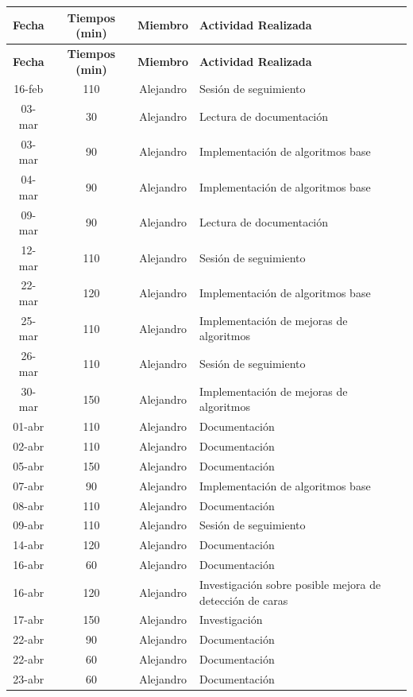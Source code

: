\documentclass[a4paper]{article}
\begin{document}
\begin{center}
\begin{longtable}{|c|c|c|p{8cm}|}
\hline
\textbf{Fecha} & \textbf{Tiempos (min)} & \textbf{Miembro} & \textbf{Actividad Realizada} \\
\hline
\endfirsthead
\hline
\textbf{Fecha} & \textbf{Tiempos (min)} & \textbf{Miembro} & \textbf{Actividad Realizada} \\
\hline
\endhead
16-feb & 110 & Alejandro & Sesión de seguimiento \\
03-mar & 30  & Alejandro & Lectura de documentación \\
03-mar & 90  & Alejandro & Implementación de algoritmos base \\
04-mar & 90  & Alejandro & Implementación de algoritmos base \\
09-mar & 90  & Alejandro & Lectura de documentación \\
12-mar & 110 & Alejandro & Sesión de seguimiento \\
22-mar & 120 & Alejandro & Implementación de algoritmos base \\
25-mar & 110 & Alejandro & Implementación de mejoras de algoritmos \\
26-mar & 110 & Alejandro & Sesión de seguimiento \\
30-mar & 150 & Alejandro & Implementación de mejoras de algoritmos \\
01-abr & 110 & Alejandro & Documentación \\
02-abr & 110 & Alejandro & Documentación \\
05-abr & 150 & Alejandro & Documentación \\
07-abr & 90  & Alejandro & Implementación de algoritmos base \\
08-abr & 110 & Alejandro & Documentación \\
09-abr & 110 & Alejandro & Sesión de seguimiento \\
14-abr & 120 & Alejandro & Documentación \\
16-abr & 60  & Alejandro & Documentación \\
16-abr & 120 & Alejandro & Investigación sobre posible mejora de detección de caras \\
17-abr & 150 & Alejandro & Investigación \\
22-abr & 90  & Alejandro & Documentación \\
22-abr & 60  & Alejandro & Documentación \\
23-abr & 60  & Alejandro & Documentación \\

\end{longtable}
\end{center}
\end{document}
